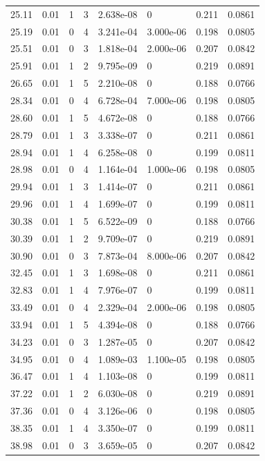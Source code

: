 \documentclass[preview]{standalone}
\begin{document}
{{{\begin{tabular}{L{1.2cm}C{1.2cm} C{0.3cm}C{0.5cm} C{1.4cm}C{1.4cm} C{1.4cm}C{1.4cm}}
  25.11  &  0.01  & 1     &  3 &  2.638e-08  & 0  & 0.211 &  0.0861   \\ 
  25.19  &  0.01  & 0     &  4 &  3.241e-04  & 3.000e-06  & 0.198 &  0.0805   \\ 
  25.51  &  0.01  & 0     &  3 &  1.818e-04  & 2.000e-06  & 0.207 &  0.0842   \\ 
  25.91  &  0.01  & 1     &  2 &  9.795e-09  & 0  & 0.219 &  0.0891   \\ 
  26.65  &  0.01  & 1     &  5 &  2.210e-08  & 0  & 0.188 &  0.0766   \\ 
  28.34  &  0.01  & 0     &  4 &  6.728e-04  & 7.000e-06  & 0.198 &  0.0805   \\ 
  28.60  &  0.01  & 1     &  5 &  4.672e-08  & 0  & 0.188 &  0.0766   \\ 
  28.79  &  0.01  & 1     &  3 &  3.338e-07  & 0  & 0.211 &  0.0861   \\ 
  28.94  &  0.01  & 1     &  4 &  6.258e-08  & 0  & 0.199 &  0.0811   \\ 
  28.98  &  0.01  & 0     &  4 &  1.164e-04  & 1.000e-06  & 0.198 &  0.0805   \\ 
  29.94  &  0.01  & 1     &  3 &  1.414e-07  & 0  & 0.211 &  0.0861   \\ 
  29.96  &  0.01  & 1     &  4 &  1.699e-07  & 0  & 0.199 &  0.0811   \\ 
  30.38  &  0.01  & 1     &  5 &  6.522e-09  & 0  & 0.188 &  0.0766   \\ 
  30.39  &  0.01  & 1     &  2 &  9.709e-07  & 0  & 0.219 &  0.0891   \\ 
  30.90  &  0.01  & 0     &  3 &  7.873e-04  & 8.000e-06  & 0.207 &  0.0842   \\ 
  32.45  &  0.01  & 1     &  3 &  1.698e-08  & 0  & 0.211 &  0.0861   \\ 
  32.83  &  0.01  & 1     &  4 &  7.976e-07  & 0  & 0.199 &  0.0811   \\ 
  33.49  &  0.01  & 0     &  4 &  2.329e-04  & 2.000e-06  & 0.198 &  0.0805   \\ 
  33.94  &  0.01  & 1     &  5 &  4.394e-08  & 0  & 0.188 &  0.0766   \\ 
  34.23  &  0.01  & 0     &  3 &  1.287e-05  & 0  & 0.207 &  0.0842   \\ 
  34.95  &  0.01  & 0     &  4 &  1.089e-03  & 1.100e-05  & 0.198 &  0.0805   \\ 
  36.47  &  0.01  & 1     &  4 &  1.103e-08  & 0  & 0.199 &  0.0811   \\ 
  37.22  &  0.01  & 1     &  2 &  6.030e-08  & 0  & 0.219 &  0.0891   \\ 
  37.36  &  0.01  & 0     &  4 &  3.126e-06  & 0  & 0.198 &  0.0805   \\ 
  38.35  &  0.01  & 1     &  4 &  3.350e-07  & 0  & 0.199 &  0.0811   \\ 
  38.98  &  0.01  & 0     &  3 &  3.659e-05  & 0  & 0.207 &  0.0842   \\ 
\hline 
\end{tabular} 

}}}
\end{document}
